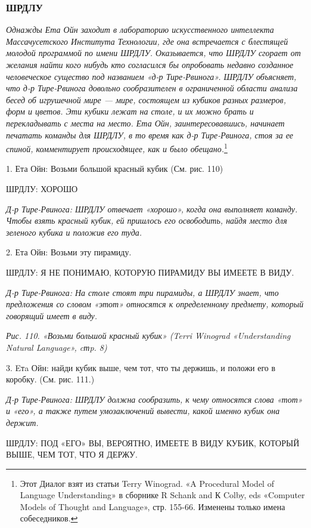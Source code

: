 \subsubsection{ШРДЛУ}

\emph{Однажды Ета Ойн заходит в лабораторию искусственного интеллекта Массачусетского Института Технологии, где она встречается с блестящей молодой программой по имени ШРДЛУ. Оказывается, что ШРДЛУ сгорает от желания найти кого нибудь кто согласился бы опробовать недавно созданное человеческое существо под названием «д-р Тире-Рвинога». ШРДЛУ объясняет, что д-р Тире-Рвинога довольно сообразителен в ограниченной области анализа бесед об игрушечной мире --- мире, состоящем из кубиков разных размеров, форм и цветов. Эти кубики лежат на столе, и их можно брать и перекладывать с места на место. Ета Ойн, заинтересовавшись, начинает печатать команды для ШРДЛУ, в то время как д-р Тире-Рвинога, стоя за ее спиной, комментирует происходящее, как и было обещано.}\footnote{Этот Диалог взят из статьи Terry Winograd. «A Procedural Model of Language Understanding» в сборнике R Schank and К Colby, eds «Computer Models of Thought and Language», стр. 155-66. Изменены только имена собеседников.}

1. Ета Ойн: Возьми большой красный кубик (См. рис. 110)

ШРДЛУ: ХОРОШО

\emph{Д-р Тире-Рвинога: ШРДЛУ отвечает «хорошо», когда она выполняет команду. Чтобы взять красный кубик, ей пришлось его освободить, найдя место для зеленого кубика и положив его туда.}

2. Ета Ойн: Возьми эту пирамиду.

ШРДЛУ: Я НЕ ПОНИМАЮ, КОТОРУЮ ПИРАМИДУ ВЫ ИМЕЕТЕ В ВИДУ.

\emph{Д-р Тире-Рвинога: На столе стоят три пирамиды, а ШРДЛУ знает, что предложения со словом «этот» относятся к определенному предмету, который говорящий имеет в виду.}

\emph{Рис. 110. «Возьми большой красный кубик» (Terri Winograd «Understanding Natural Language», cтp. 8)}

3. Eтa Ойн: найди кубик выше, чем тот, что ты держишь, и положи его в коробку. (См. рис. 111.)

\emph{Д-р Тире-Рвинога: ШРДЛУ должна сообразить, к чему относятся слова «тот» и «его», а также путем умозаключений вывести, какой именно кубик она держит.}

ШРДЛУ: ПОД «ЕГО» ВЫ, ВЕРОЯТНО, ИМЕЕТЕ В ВИДУ КУБИК, КОТОРЫЙ ВЫШЕ, ЧЕМ ТОТ, ЧТО Я ДЕРЖУ.

